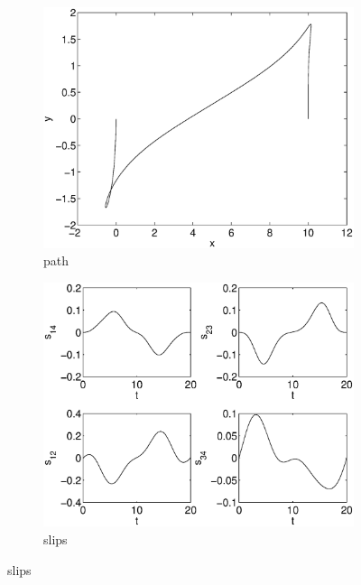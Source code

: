 \begin{figure}[h]
\begin{subfigure}[b]{\textwidth}
\centering
\includegraphics[height=0.3\textheight]{img/final_1_1_20_path.eps}
\caption{path}
\end{subfigure}

\begin{subfigure}[b]{\textwidth}
\centering
\includegraphics[height=0.3\textheight]{img/final_1_1_20_slips.eps}
\caption{slips}
\end{subfigure}


\end{figure}
